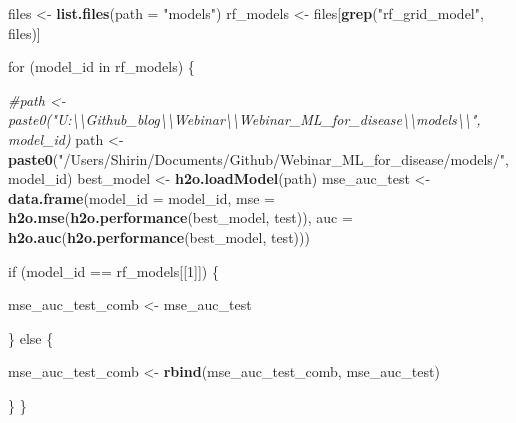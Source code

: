 \documentclass[]{article}
\newenvironment{Shaded}{\begin{snugshade}}{\end{snugshade}}
\newcommand{\KeywordTok}[1]{\textcolor[rgb]{0.13,0.29,0.53}{\textbf{{#1}}}}
\newcommand{\DataTypeTok}[1]{\textcolor[rgb]{0.13,0.29,0.53}{{#1}}}
\newcommand{\DecValTok}[1]{\textcolor[rgb]{0.00,0.00,0.81}{{#1}}}
\newcommand{\StringTok}[1]{\textcolor[rgb]{0.31,0.60,0.02}{{#1}}}
\newcommand{\CommentTok}[1]{\textcolor[rgb]{0.56,0.35,0.01}{\textit{{#1}}}}
\newcommand{\NormalTok}[1]{{#1}}
\begin{document}
\begin{Shaded}
\begin{Highlighting}[]
\NormalTok{files <-}\StringTok{ }\KeywordTok{list.files}\NormalTok{(}\DataTypeTok{path =} \StringTok{"models"}\NormalTok{)}
\NormalTok{rf_models <-}\StringTok{ }\NormalTok{files[}\KeywordTok{grep}\NormalTok{(}\StringTok{"rf_grid_model"}\NormalTok{, files)]}

\NormalTok{for (model_id in rf_models) \{}
  
  \CommentTok{#path <- paste0("U:\textbackslash{}\textbackslash{}Github_blog\textbackslash{}\textbackslash{}Webinar\textbackslash{}\textbackslash{}Webinar_ML_for_disease\textbackslash{}\textbackslash{}models\textbackslash{}\textbackslash{}", model_id)}
  \NormalTok{path <-}\StringTok{ }\KeywordTok{paste0}\NormalTok{(}\StringTok{"/Users/Shirin/Documents/Github/Webinar_ML_for_disease/models/"}\NormalTok{, model_id)}
  \NormalTok{best_model <-}\StringTok{ }\KeywordTok{h2o.loadModel}\NormalTok{(path)}
  \NormalTok{mse_auc_test <-}\StringTok{ }\KeywordTok{data.frame}\NormalTok{(}\DataTypeTok{model_id =} \NormalTok{model_id, }
                             \DataTypeTok{mse =} \KeywordTok{h2o.mse}\NormalTok{(}\KeywordTok{h2o.performance}\NormalTok{(best_model, test)),}
                             \DataTypeTok{auc =} \KeywordTok{h2o.auc}\NormalTok{(}\KeywordTok{h2o.performance}\NormalTok{(best_model, test)))}
  
  \NormalTok{if (model_id ==}\StringTok{ }\NormalTok{rf_models[[}\DecValTok{1}\NormalTok{]]) \{}
    
    \NormalTok{mse_auc_test_comb <-}\StringTok{ }\NormalTok{mse_auc_test}
    
  \NormalTok{\} else \{}
    
    \NormalTok{mse_auc_test_comb <-}\StringTok{ }\KeywordTok{rbind}\NormalTok{(mse_auc_test_comb, mse_auc_test)}
    
  \NormalTok{\}}
\NormalTok{\}}


\end{Highlighting}
\end{Shaded}
\end{document}
